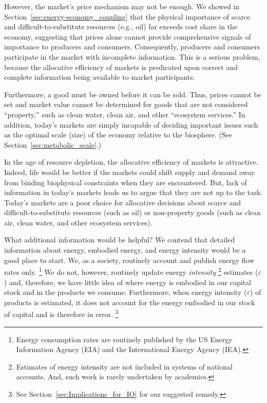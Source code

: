 However, the market's price mechanism may not be enough.
We showed in Section~\ref{sec:energy-economy_coupling}
that the physical importance 
of scarce and difficult-to-substitute resources (e.g., oil) 
far exceeds cost share in the economy,
suggesting that prices alone cannot provide comprehensive
signals of importance to producers and consumers.
Consequently, producers and consumers participate 
in the market with incomplete information.
This is a serious problem, 
because the allocative efficiency of markets 
is predicated upon
correct and complete information being available to market participants.

Furthermore, a good must be owned before 
it can be sold.
Thus, prices cannot be set and market value cannot be determined
for goods that are not considered ``property,'' 
such as clean water, clean air, and other ``ecosystem services.''
In addition, today's markets are simply incapable of deciding
important issues such as the optimal scale (size) of the economy
relative to the biosphere. (See Section~\ref{sec:metabolic_scale}.)

In the age of resource depletion, the allocative efficiency of markets is attractive.
Indeed, life would be better if the markets could shift supply and demand away from
binding biophysical constraints when they are encountered. 
But, lack of information
in today’s markets leads us to argue that they are not up to the task. 
Today’s markets are a poor choice for allocative decisions 
about scarce and difficult-to-substitute resources (such as oil)
or non-property goods (such as clean air, clean water, and other ecosystem services).

What additional information would be helpful?
We contend that detailed information about energy, embodied energy, and energy intensity
would be a good place to start.
We, as a society, routinely account and publish energy flow rates only.%
	 \footnote{
	 Energy consumption rates are routinely published by the 
	 US Energy Information Agency (EIA) and the 
	 International Energy Agency (IEA).
	 }
We do not, however, routinely update energy \emph{intensity}%
	\footnote{
	Estimates of energy intensity are not included in systems of national accounts.
	And, such work is rarely undertaken by academics.\citep{Bullard1975, EIOLCA2014} 
	}
estimates ($\varepsilon$)
and, therefore, 
we have little idea of where energy is embodied 
in our capital stock and 
in the products we consume.
Furthermore, when energy intensity ($\varepsilon$) of products is estimated, 
it does not account for the energy embodied in our stock of capital
and is therefore in error.%
	\footnote{
	See Section~\ref{sec:Implications_for_IO} for our suggested remedy.
	}
	
